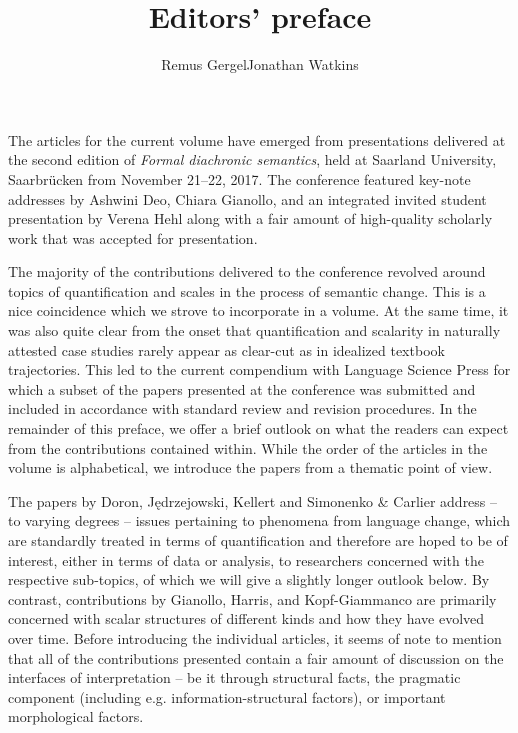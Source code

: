 \documentclass[output=paper]{langsci/langscibook}
\title{Editors' preface}
\author{Remus Gergel\affiliation{Universität des Saarlandes}\lastand Jonathan Watkins\affiliation{Universität des Saarlandes}}
\begin{document}
\maketitle

\noindent The articles for the current volume have emerged from presentations delivered at the second edition of \textit{Formal diachronic semantics}, held at Saarland University, Saarbrücken from November 21--22, 2017. The conference featured key-note addresses by Ashwini Deo, Chiara Gianollo, and an integrated invited student presentation by Verena Hehl along with a fair amount of high-quality scholarly work that was accepted for presentation.

The majority of the contributions delivered to the conference revolved around topics of quantification and scales in the process of semantic change. This is a nice coincidence which we strove to incorporate in a volume. At the same time, it was also quite clear from the onset that quantification and scalarity in naturally attested case studies rarely appear as clear-cut as in idealized textbook trajectories. This led to the current compendium with Language Science Press for which a subset of the papers presented at the conference was submitted and included in accordance with standard review and revision procedures. In the remainder of this preface, we offer a brief outlook on what the readers can expect from the contributions contained within. While the order of the articles in the volume is alphabetical, we introduce the papers from a thematic point of view.

The papers by Doron, Jędrzejowski, Kellert and Simonenko \& Carlier address – to varying degrees – issues pertaining to phenomena from language change, which are standardly treated in terms of quantification and therefore are hoped to be of interest, either in terms of data or analysis, to researchers concerned with the respective sub-topics, of which we will give a slightly longer outlook below. By contrast, contributions by Gianollo, Harris, and Kopf-Giammanco are primarily concerned with scalar structures of different kinds and how they have evolved over time. Before introducing the individual articles, it seems of note to mention that all of the contributions presented contain a fair amount of discussion on the interfaces of interpretation – be it through structural facts, the pragmatic component (including e.g. information-structural factors), or important morphological factors.\largerpage
\end{document}
